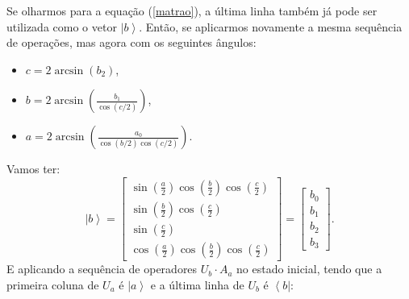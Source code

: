 Se olharmos para a equação (\ref{matrao}), a última linha também já pode ser utilizada como o vetor $\left|b\right\rangle $. Então, se aplicarmos novamente a mesma sequência de operações, mas agora com os seguintes ângulos:
\begin{itemize}
\item $c=2\arcsin\left(b_{2}\right)$,
\item $b=2\arcsin\left(\frac{b_{1}}{\cos\left(c/2\right)}\right)$,
\item $a=2\arcsin\left(\frac{a_{0}}{\cos\left(b/2\right)\cos\left(c/2\right)}\right)$.
\end{itemize}
Vamos ter:
\begin{equation}
\left|b\right\rangle =\left[\begin{array}{c}
\sin\left(\frac{a}{2}\right)\cos\left(\frac{b}{2}\right)\cos\left(\frac{c}{2}\right)\\
\sin\left(\frac{b}{2}\right)\cos\left(\frac{c}{2}\right)\\
\sin\left(\frac{c}{2}\right)\\
\cos\left(\frac{a}{2}\right)\cos\left(\frac{b}{2}\right)\cos\left(\frac{c}{2}\right)
\end{array}\right]=\left[\begin{array}{c}
b_{0}\\
b_{1}\\
b_{2}\\
b_{3}
\end{array}\right]
. \end{equation}
E aplicando a sequência de operadores $U_b\cdot A_a$ no estado inicial, tendo que a primeira coluna de $U_a$ é $\left|a\right\rangle $ e a última linha de $U_b$ é $\left\langle b\right|$:
